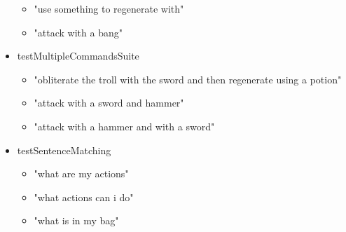 \documentclass[11pt]{article}
\begin{document}
\begin{scriptsize}
\begin{itemize}
\begin{itemize}
	\item "use something to regenerate with"
	\item "attack with a bang"
	\end{itemize}
\item testMultipleCommandsSuite
	\begin{itemize}
	\item "obliterate the troll with the sword and then regenerate using a potion"
	\item "attack with a sword and hammer"
	\item "attack with a hammer and with a sword"
	\end{itemize}
\item testSentenceMatching
	\begin{itemize}
	\item "what are my actions"
	\item "what actions can i do"
	\item "what is in my bag"
	\end{itemize}
\end{itemize}
\end{scriptsize}
\end{document}
